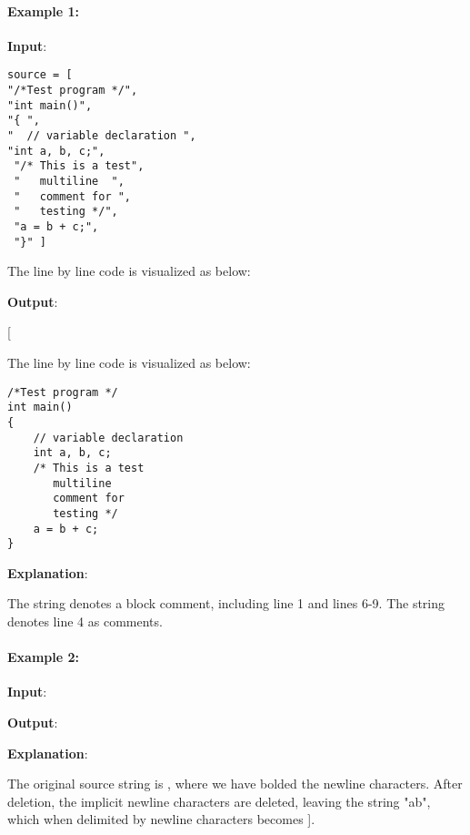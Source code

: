 \paragraph{Example 1:}
\begin{flushleft}


\textbf{Input}: 

\begin{lstlisting}[style=customc]
source = [
"/*Test program */", 
"int main()", 
"{ ", 
"  // variable declaration ", 
"int a, b, c;",
 "/* This is a test", 
 "   multiline  ", 
 "   comment for ", 
 "   testing */", 
 "a = b + c;", 
 "}" ]
\end{lstlisting}

The line by line code is visualized as below:


\textbf{Output}: 

[\fcc{"int main()","{ ","  ","int a, b, c;","a = b + c;","}"]}

The line by line code is visualized as below:

\begin{lstlisting}[style=customc]
/*Test program */
int main()
{
    // variable declaration
    int a, b, c;
    /* This is a test
       multiline
       comment for
       testing */
    a = b + c;
}
\end{lstlisting}

\textbf{Explanation}:
 
The string \fcc{/*} denotes a block comment, including line 1 and lines 6-9. The string \fcc{//} denotes line 4 as comments.
\end{flushleft}

\paragraph{Example 2:}
\begin{flushleft}



\textbf{Input}: 


\textbf{Output}: \fcc{["ab"]}

\textbf{Explanation}: 

The original source string is , where we have bolded the newline characters.  After deletion, the implicit newline characters are deleted, leaving the string "ab", which when delimited by newline characters becomes \fcc{["ab"}].
\end{flushleft}

